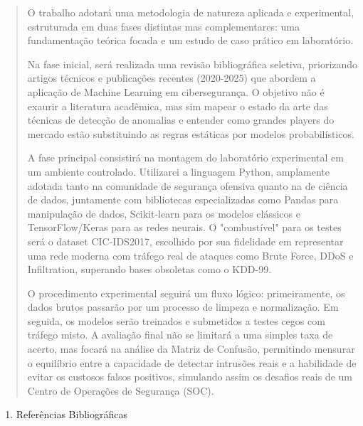 \documentclass[]{article}
\begin{document}
\begin{quote}
O trabalho adotará uma metodologia de natureza aplicada e experimental,
estruturada em duas fases distintas mas complementares: uma
fundamentação teórica focada e um estudo de caso prático em laboratório.

Na fase inicial, será realizada uma revisão bibliográfica seletiva,
priorizando artigos técnicos e publicações recentes (2020-2025) que
abordem a aplicação de Machine Learning em cibersegurança. O objetivo
não é exaurir a literatura acadêmica, mas sim mapear o estado da arte
das técnicas de detecção de anomalias e entender como grandes players do
mercado estão substituindo as regras estáticas por modelos
probabilísticos.

A fase principal consistirá na montagem do laboratório experimental em
um ambiente controlado. Utilizarei a linguagem Python, amplamente
adotada tanto na comunidade de segurança ofensiva quanto na de ciência
de dados, juntamente com bibliotecas especializadas como Pandas para
manipulação de dados, Scikit-learn para os modelos clássicos e
TensorFlow/Keras para as redes neurais. O "combustível" para os testes
será o dataset CIC-IDS2017, escolhido por sua fidelidade em representar
uma rede moderna com tráfego real de ataques como Brute Force, DDoS e
Infiltration, superando bases obsoletas como o KDD-99.

O procedimento experimental seguirá um fluxo lógico: primeiramente, os
dados brutos passarão por um processo de limpeza e normalização. Em
seguida, os modelos serão treinados e submetidos a testes cegos com
tráfego misto. A avaliação final não se limitará a uma simples taxa de
acerto, mas focará na análise da Matriz de Confusão, permitindo mensurar
o equilíbrio entre a capacidade de detectar intrusões reais e a
habilidade de evitar os custosos falsos positivos, simulando assim os
desafios reais de um Centro de Operações de Segurança (SOC).
\end{quote}

\begin{enumerate}
\def\labelenumi{\arabic{enumi}.}
\setcounter{enumi}{4}
\item
  Referências Bibliográficas
\end{enumerate}
\end{document}
